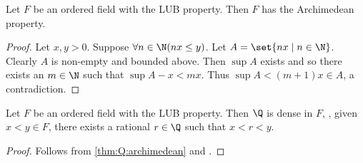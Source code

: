 
\begin{theorem*}
    Let $F$ be an ordered field with the LUB property.
    Then $F$ has the Archimedean property.
\end{theorem*}
\begin{proof}
    Let $x, y > 0$.
    Suppose $\forall n \in \N (nx \le y)$.
    Let $A = \set{nx \mid n \in \N}$.
    Clearly $A$ is non-empty and bounded above.
    Then $\sup A$ exists and so there exists an $m \in \N$ such that
    $\sup A - x < m x$.
    Thus $\sup A < (m + 1)x \in A$, a contradiction.
\end{proof}

\begin{theorem*}
    Let $F$ be an ordered field with the LUB property.
    Then $\Q$ is dense in $F$, \ie, given $x < y \in F$, there exists a
    rational $r \in \Q$ such that $x < r < y$.
\end{theorem*}
\begin{proof}
    Follows from \cref{thm:Q:archimedean} and
    .
\end{proof}

